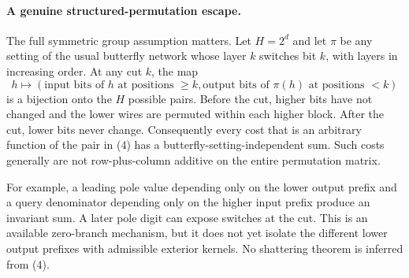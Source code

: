 \documentclass[11pt]{article}
\begin{document}
\paragraph{A genuine structured-permutation escape.}
The full symmetric group assumption matters. Let $H=2^d$ and let
$\pi$ be any setting of the usual butterfly network whose layer $k$
switches bit $k$, with layers in increasing order. At any cut $k$,
the map
\[
 h\longmapsto
 (\text{input bits of }h\text{ at positions }\geq k,
  \text{output bits of }\pi(h)\text{ at positions }<k)
 \tag{4}
\]
is a bijection onto the $H$ possible pairs. Before the cut, higher
bits have not changed and the lower wires are permuted within each
higher block. After the cut, lower bits never change. Consequently
every cost that is an arbitrary function of the pair in (4) has a
butterfly-setting-independent sum. Such costs generally are not
row-plus-column additive on the entire permutation matrix.

For example, a leading pole value depending only on the lower output
prefix and a query denominator depending only on the higher input
prefix produce an invariant sum. A later pole digit can expose
switches at the cut. This is an available zero-branch mechanism, but
it does not yet isolate the different lower output prefixes with
admissible exterior kernels. No shattering theorem is inferred from
(4).
\end{document}
